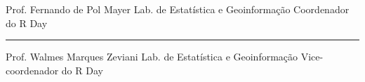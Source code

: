 \documentclass[a4paper, 11pt]{letter}
\begin{document}
\begin{letter}{}
\begin{minipage}[b]{0.45\linewidth}
\begin{flushright}
      Prof. Fernando de Pol Mayer\newline
      Lab. de Estatística e Geoinformação\newline
      Coordenador do R Day\newline
    \end{flushright}

  \end{minipage}
  \hfill
  \begin{minipage}[b]{0.45\linewidth}

    \vspace*{2em}
    \vspace*{-4em}

    \begin{flushright}
      \rule{\textwidth}{0.5pt}

      Prof. Walmes Marques Zeviani\newline
      Lab. de Estatística e Geoinformação\newline
      Vice-coordenador do R Day\newline
    \end{flushright}

  \end{minipage}

  \vfill

\end{letter}
\end{document}
